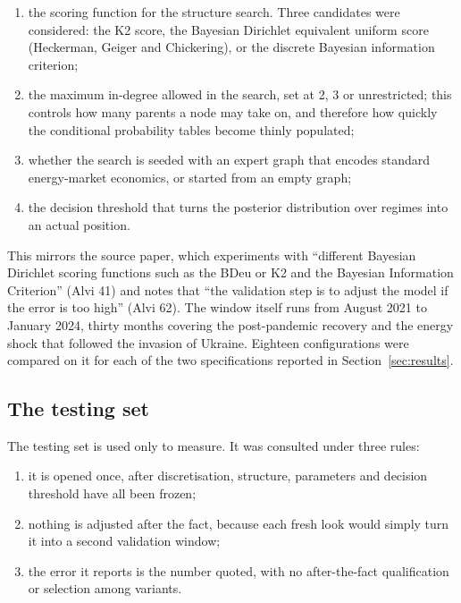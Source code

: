 \documentclass[11pt,a4paper]{article}
\begin{document}
\begin{enumerate}
\item the scoring function for the structure search. Three candidates were considered: the K2 score, the Bayesian Dirichlet
      equivalent uniform score (Heckerman, Geiger and Chickering), or the discrete Bayesian
      information criterion;
\item the maximum in-degree allowed in the search, set at 2, 3 or unrestricted; this controls how
      many parents a node may take on, and therefore how quickly the conditional probability
      tables become thinly populated;
\item whether the search is seeded with an expert graph that encodes standard energy-market
      economics, or started from an empty graph;
\item the decision threshold that turns the posterior distribution over regimes into an actual
      position.
\end{enumerate}

This mirrors the source paper, which experiments with ``different Bayesian Dirichlet scoring
functions such as the BDeu or K2 and the Bayesian Information Criterion'' (Alvi 41) and notes that
``the validation step is to adjust the model if the error is too high'' (Alvi 62). The window itself
runs from August 2021 to January 2024, thirty months covering the post-pandemic recovery and the
energy shock that followed the invasion of Ukraine. Eighteen configurations were compared on it
for each of the two specifications reported in Section~\ref{sec:results}.

\subsection{The testing set}

The testing set is used only to measure. It was consulted under three rules:

\begin{enumerate}
\item it is opened once, after discretisation, structure, parameters and decision threshold have
      all been frozen;
\item nothing is adjusted after the fact, because each fresh look would simply turn it into a
      second validation window;
\item the error it reports is the number quoted, with no after-the-fact qualification or selection
      among variants.
\end{enumerate}
\end{document}
